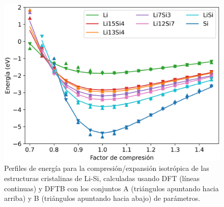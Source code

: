 \begin{figure}[th]
    \centering
    \includegraphics[width=.7\textwidth]{Silicio/modelo/resultados/compresion/compresion.png}
    \caption{Perfiles de energía para la compresión/expansión isotrópica de las 
    estructuras cristalinas de Li-Si, calculadas usando DFT (líneas continuas) 
    y DFTB con los conjuntos A (triángulos apuntando hacia arriba) y B 
    (triángulos apuntando hacia abajo) de parámetros.}
    \label{fig:compresion}
\end{figure}


